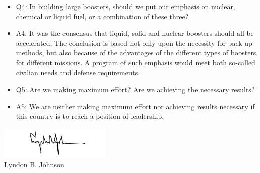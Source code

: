 \documentclass[letterpaper,11pt]{texMemo}
\begin{document}
\begin{itemize}
 \item Q4: In building large boosters, should we put our emphasis on nuclear, chemical or liquid fuel, or a combination of these three?
 \item A4: It was the consensus that liquid, solid and nuclear boosters should all be accelerated.  The conclusion is based not only upon the necessity for back-up methods, but also because of the advantages of the different types of boosters for different missions.  A program of such emphasis would meet both so-called civilian needs and defense requirements.
 \item Q5: Are we making maximum effort?  Are we achieving the necessary results?
 \item A5: We are neither making maximum effort nor achieving results necessary if this country is to reach a position of leadership.
\end{itemize}

\includegraphics[width=0.4\textwidth]{Lyndon-Johnson-Signature.jpg}\\
\hspace*{0.9in} Lyndon B. Johnson
\end{document}
